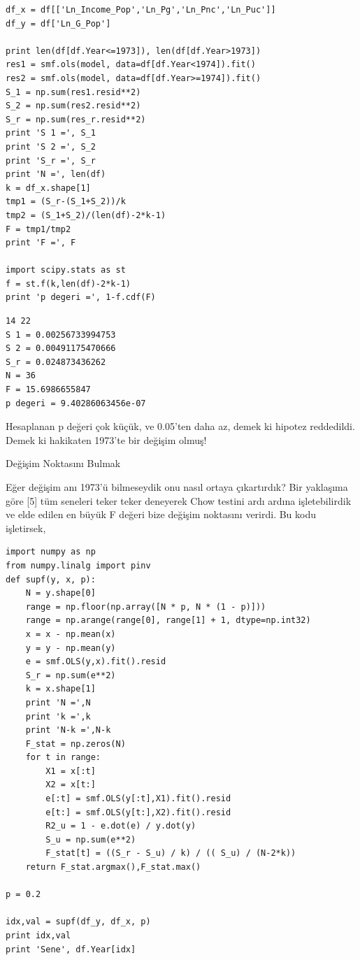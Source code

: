 \documentclass[12pt,fleqn]{article}\usepackage{../../common}
\begin{document}
\begin{verbatim}
df_x = df[['Ln_Income_Pop','Ln_Pg','Ln_Pnc','Ln_Puc']]
df_y = df['Ln_G_Pop']

print len(df[df.Year<=1973]), len(df[df.Year>1973])
res1 = smf.ols(model, data=df[df.Year<1974]).fit()
res2 = smf.ols(model, data=df[df.Year>=1974]).fit()
S_1 = np.sum(res1.resid**2)
S_2 = np.sum(res2.resid**2)
S_r = np.sum(res_r.resid**2)
print 'S 1 =', S_1
print 'S 2 =', S_2
print 'S_r =', S_r
print 'N =', len(df)
k = df_x.shape[1]
tmp1 = (S_r-(S_1+S_2))/k
tmp2 = (S_1+S_2)/(len(df)-2*k-1)
F = tmp1/tmp2
print 'F =', F

import scipy.stats as st
f = st.f(k,len(df)-2*k-1)
print 'p degeri =', 1-f.cdf(F)
\end{verbatim}

\begin{verbatim}
14 22
S 1 = 0.00256733994753
S 2 = 0.00491175470666
S_r = 0.024873436262
N = 36
F = 15.6986655847
p degeri = 9.40286063456e-07
\end{verbatim}

Hesaplanan p değeri çok küçük, ve 0.05'ten daha az, demek ki hipotez
reddedildi. Demek ki hakikaten 1973'te bir değişim olmuş!

Değişim Noktasını Bulmak

Eğer değişim anı 1973'ü bilmeseydik onu nasıl ortaya çıkartırdık? Bir
yaklaşıma göre [5] tüm seneleri teker teker deneyerek Chow testini ardı
ardına işletebilirdik ve elde edilen en büyük F değeri bize değişim
noktasını verirdi. Bu kodu işletirsek,

\begin{verbatim}
import numpy as np
from numpy.linalg import pinv
def supf(y, x, p):
    N = y.shape[0]
    range = np.floor(np.array([N * p, N * (1 - p)]))
    range = np.arange(range[0], range[1] + 1, dtype=np.int32)
    x = x - np.mean(x)
    y = y - np.mean(y)
    e = smf.OLS(y,x).fit().resid
    S_r = np.sum(e**2)
    k = x.shape[1]
    print 'N =',N
    print 'k =',k
    print 'N-k =',N-k
    F_stat = np.zeros(N)
    for t in range:
        X1 = x[:t]
        X2 = x[t:]
        e[:t] = smf.OLS(y[:t],X1).fit().resid
        e[t:] = smf.OLS(y[t:],X2).fit().resid
        R2_u = 1 - e.dot(e) / y.dot(y)
        S_u = np.sum(e**2)
        F_stat[t] = ((S_r - S_u) / k) / (( S_u) / (N-2*k))
    return F_stat.argmax(),F_stat.max()
    
p = 0.2

idx,val = supf(df_y, df_x, p)
print idx,val
print 'Sene', df.Year[idx]
\end{verbatim}
\end{document}
